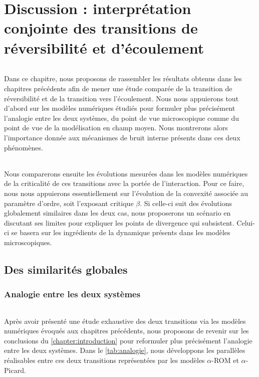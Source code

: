 \chapter[Discussion : interprétation conjointe des transitions de réversibilité\\ et d'écoulement]{Discussion : interprétation conjointe des transitions de réversibilité et d'écoulement}

\label{chapter:discussion}

\subparagraph{}Dans ce chapitre, nous proposons de rassembler les résultats obtenus dans les chapitres précédents afin de mener une étude comparée de la transition de réversibilité et de la transition vers l'écoulement. Nous nous appuierons tout d'abord sur les modèles numériques étudiés pour formuler plus précisément l'analogie entre les deux systèmes, du point de vue microscopique comme du point de vue de la modélisation en champ moyen. Nous montrerons alors l'importance donnée aux mécanismes de bruit interne présents dans ces deux phénomènes.

\subparagraph{}Nous comparerons ensuite les évolutions mesurées dans les modèles numériques de la criticalité de ces transitions avec la portée de l'interaction. Pour ce faire, nous nous appuierons essentiellement sur l'évolution de la convexité associée au paramètre d'ordre, soit l'exposant critique $\beta$. Si celle-ci suit des évolutions globalement similaires dans les deux cas, nous proposerons un scénario en discutant ses limites pour expliquer les points de divergence qui subsistent. Celui-ci se basera sur les ingrédients de la dynamique présents dans les modèles microscopiques.

\section{Des similarités globales}

\subsection{Analogie entre les deux systèmes}

\subparagraph{}Après avoir présenté une étude exhaustive des deux transitions via les modèles numériques évoqués aux chapitres précédents, nous proposons de revenir sur les conclusions du \autoref{chapter:introduction} pour reformuler plus précisément l'analogie entre les deux systèmes. Dans le \autoref{tab:analogie}, nous développons les parallèles réalisables entre ces deux transitions représentées par les modèles $\alpha$-ROM et $\alpha$-Picard.

